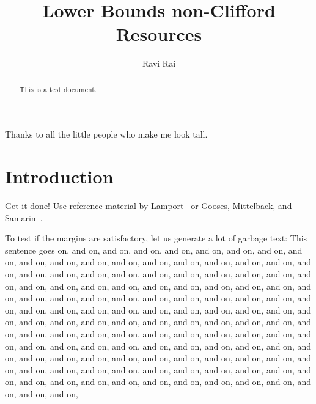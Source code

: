 \documentclass[12pt]{dalthesis}
\begin{document}
\title{Lower Bounds non-Clifford Resources}
\author{Ravi Rai}

\mcs  %





\nolistoftables
\nolistoffigures

\frontmatter

\begin{abstract}
This is a test document.
\end{abstract}

\begin{acknowledgements}
Thanks to all the little people who make me look tall.
\end{acknowledgements}

\mainmatter

\chapter{Introduction}

Get it done!  Use reference material by Lamport~\cite{latex-by-lamport} or
Gooses, Mittelback, and Samarin~\cite{latex-companion}.

To test if the margins are satisfactory, let us generate a lot of
garbage text:
This sentence goes on, and on, and on, and on,
and on, and on, and on, and on, and on, and on, and on, and on, and on,
and on, and on, and on, and on, and on, and on, and on, and on, and on,
and on, and on, and on, and on, and on, and on, and on, and on, and on,
and on, and on, and on, and on, and on, and on, and on, and on, and on,
and on, and on, and on, and on, and on, and on, and on, and on, and on,
and on, and on, and on, and on, and on, and on, and on, and on, and on,
and on, and on, and on, and on, and on, and on, and on, and on, and on,
and on, and on, and on, and on, and on, and on, and on, and on, and on,
and on, and on, and on, and on, and on, and on, and on, and on, and on,
and on, and on, and on, and on, and on, and on, and on, and on, and on,
and on, and on, and on, and on, and on, and on, and on, and on, and on,
and on, and on, and on, and on, and on, and on, and on, and on, and on,
and on, and on, and on, and on, and on, and on, and on, and on, and on,
\end{document}
